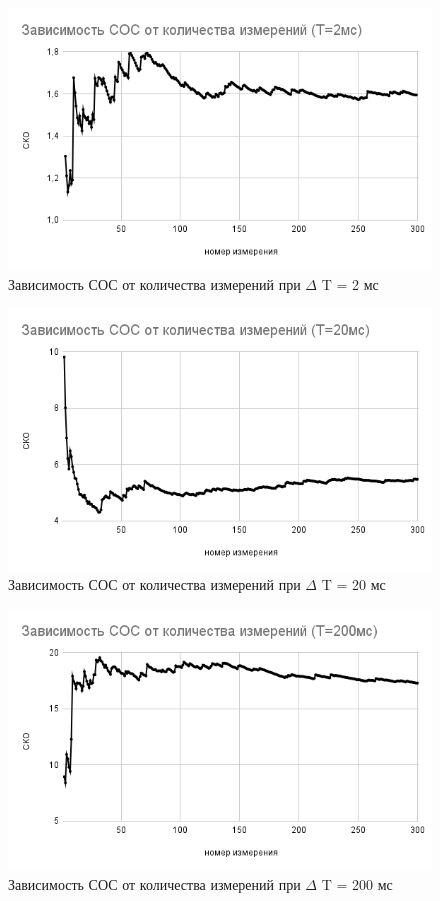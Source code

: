 \documentclass[a4paper,12pt]{article}
\begin{document}
\begin{figure}[ht!]
    \centering
    \includegraphics[scale=0.7]{sos2.png}
    \caption{Зависимость СОС от количества измерений при $\Delta$ T = 2 мс}
\end{figure}

\begin{figure}[ht!]
    \centering
    \includegraphics[scale=0.7]{sos20.png}
    \caption{Зависимость СОС от количества измерений при $\Delta$ T = 20 мс}
\end{figure}

\begin{figure}[ht!]
    \centering
    \includegraphics[scale=0.7]{sos200.png}
    \caption{Зависимость СОС от количества измерений при $\Delta$ T = 200 мс}
\end{figure}
\end{document}
